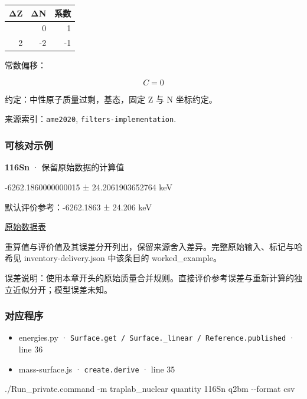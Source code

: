 \documentclass[
  11pt,
  letterpaper,
]{article}
\newenvironment{Shaded}{}{}
\newcommand{\AttributeTok}[1]{\textcolor[rgb]{0.49,0.56,0.16}{#1}}
\newcommand{\ExtensionTok}[1]{#1}
\newcommand{\NormalTok}[1]{#1}
\providecommand{\tightlist}{%
  \setlength{\itemsep}{0pt}\setlength{\parskip}{0pt}}
\begin{document}
\begin{longtable}[]{@{}rrr@{}}
\toprule\noalign{}
ΔZ & ΔN & 系数 \\
\midrule\noalign{}
\endhead
\bottomrule\noalign{}
\endlastfoot
0 & 0 & 1 \\
2 & -2 & -1 \\
\end{longtable}

常数偏移：

\[
C=0
\]

约定：中性原子质量过剩，基态，固定 Z 与 N 坐标约定。

来源索引：\texttt{ame2020}, \texttt{filters-implementation}.

\subsubsection{可核对示例}\label{ux53efux6838ux5bf9ux793aux4f8b-10}

\textbf{116Sn} · 保留原始数据的计算值

-6262.1860000000015 ± 24.2061903652764 keV

默认评价参考：-6262.1863 ± 24.206 keV

\href{https://www-nds.iaea.org/amdc/ame2020/rct1.mas20.txt}{原始数据表}

重算值与评价值及其误差分开列出，保留来源舍入差异。完整原始输入、标记与哈希见
inventory-delivery.json 中该条目的 worked\_example。

误差说明：使用本章开头的原始质量合并规则。直接评价参考误差与重新计算的独立近似分开；模型误差未知。

\subsubsection{对应程序}\label{ux5bf9ux5e94ux7a0bux5e8f-10}

\begin{itemize}
\tightlist
\item
  energies.py ·
  \texttt{Surface.get\ /\ Surface.\_linear\ /\ Reference.published} ·
  line 36
\item
  mass-surface.js · \texttt{create.derive} · line 35
\end{itemize}

\begin{Shaded}
\begin{Highlighting}[]
\ExtensionTok{./Run\_private.command} \AttributeTok{{-}m}\NormalTok{ traplab\_nuclear quantity 116Sn q2bm }\AttributeTok{{-}{-}format}\NormalTok{ csv}
\end{Highlighting}
\end{Shaded}
\end{document}
